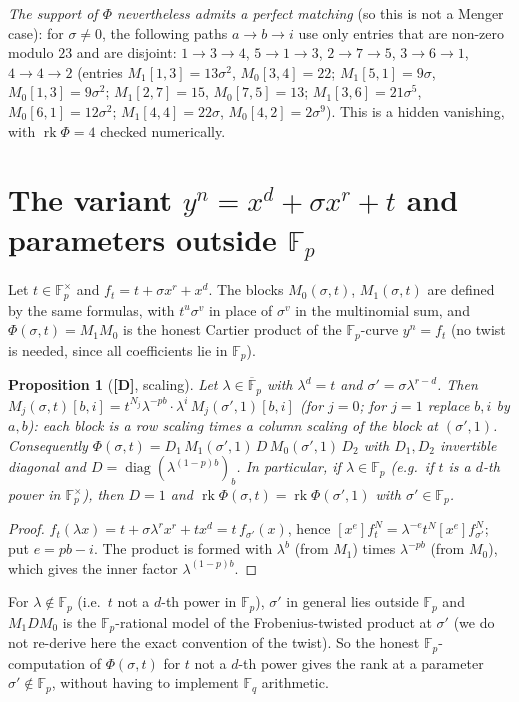 \documentclass[11pt,a4paper]{article}
\newtheorem{proposition}[theorem]{Proposition}
\newcommand{\F}{\mathbb{F}}
\begin{document}
\emph{The support of $\Phi$ nevertheless admits a perfect matching} (so this is
not a Menger case): for $\sigma\neq0$, the following paths $a\to b\to i$ use only
entries that are non-zero modulo $23$ and are disjoint: $1\to3\to4$, $5\to1\to3$,
$2\to7\to5$, $3\to6\to1$, $4\to4\to2$ (entries $M_1[1,3]=13\sigma^2$,
$M_0[3,4]=22$; $M_1[5,1]=9\sigma$, $M_0[1,3]=9\sigma^2$; $M_1[2,7]=15$,
$M_0[7,5]=13$; $M_1[3,6]=21\sigma^5$, $M_0[6,1]=12\sigma^2$;
$M_1[4,4]=22\sigma$, $M_0[4,2]=2\sigma^9$). This is a hidden vanishing, with
$\operatorname{rk}\Phi=4$ checked numerically.

\section{The variant $y^n=x^d+\sigma x^r+t$ and parameters outside $\F_p$}
\label{sec:tvar}

Let $t\in\F_p^\times$ and $f_t=t+\sigma x^r+x^d$. The blocks $M_0(\sigma,t)$,
$M_1(\sigma,t)$ are defined by the same formulas, with $t^u\sigma^v$ in place of
$\sigma^v$ in the multinomial sum, and $\Phi(\sigma,t)=M_1M_0$ is the honest
Cartier product of the $\F_p$-curve $y^n=f_t$ (no twist is needed, since all
coefficients lie in $\F_p$).

\begin{proposition}[\textbf{[D]}, scaling]
\label{prop:scal}
Let $\lambda\in\overline{\F}_p$ with $\lambda^d=t$ and $\sigma'=\sigma\lambda^{r-d}$.
Then $M_j(\sigma,t)[b,i]=t^{N_j}\lambda^{-pb}\cdot\lambda^{i}\,M_j(\sigma',1)[b,i]$
(for $j=0$; for $j=1$ replace $b,i$ by $a,b$): each block is a row scaling times a
column scaling of the block at $(\sigma',1)$. Consequently
$\Phi(\sigma,t)=D_1\,M_1(\sigma',1)\,D\,M_0(\sigma',1)\,D_2$ with $D_1,D_2$ invertible
diagonal and $D=\operatorname{diag}(\lambda^{(1-p)b})_b$. In particular, if
$\lambda\in\F_p$ (e.g.\ if $t$ is a $d$-th power in $\F_p^\times$), then $D=1$ and
$\operatorname{rk}\Phi(\sigma,t)=\operatorname{rk}\Phi(\sigma',1)$ with
$\sigma'\in\F_p$.
\end{proposition}
\begin{proof}
$f_t(\lambda x)=t+\sigma\lambda^rx^r+tx^d=t\,f_{\sigma'}(x)$, hence
$[x^e]f_t^N=\lambda^{-e}t^N[x^e]f_{\sigma'}^N$; put $e=pb-i$. The product is
formed with $\lambda^{b}$ (from $M_1$) times $\lambda^{-pb}$ (from $M_0$), which
gives the inner factor $\lambda^{(1-p)b}$.
\end{proof}
For $\lambda\notin\F_p$ (i.e.\ $t$ not a $d$-th power in $\F_p$), $\sigma'$ in
general lies outside $\F_p$ and $M_1D M_0$ is the $\F_p$-rational model of the
Frobenius-twisted product at $\sigma'$ (we do not re-derive here the exact
convention of the twist). So the honest $\F_p$-computation of $\Phi(\sigma,t)$
for $t$ not a $d$-th power gives the rank at a parameter $\sigma'\notin\F_p$,
without having to implement $\F_q$ arithmetic.
\end{document}
